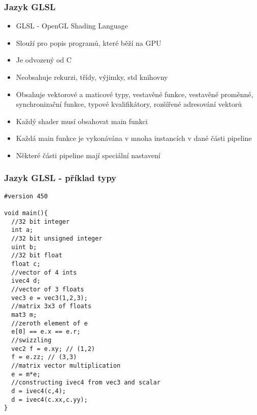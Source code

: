 \begin{frame}
\frametitle{Jazyk GLSL}
  \begin{itemize}
  \item GLSL - OpenGL Shading Language
  \item Slouží pro popis programů, které běží na GPU
  \item Je odvozený od C
  \item Neobsahuje rekurzi, třídy, výjimky, std knihovny
  \item Obsahuje vektorové a maticové typy, vestavěné funkce, vestavěné proměnné, synchronizační funkce, typové kvalifikátory, rozšířené adresování vektorů
  \item Každý shader musí obsahovat main funkci
  \item Každá main funkce je vykonávána v mnoha instancích v dané části pipeline
  \item Některé části pipeline mají speciální nastavení
  \end{itemize}
\end{frame}

\begin{frame}[fragile]
\frametitle{Jazyk GLSL - příklad typy}
		{\scriptsize
\begin{verbatim}
#version 450

void main(){
  //32 bit integer
  int a;
  //32 bit unsigned integer
  uint b;
  //32 bit float
  float c;
  //vector of 4 ints
  ivec4 d;
  //vector of 3 floats
  vec3 e = vec3(1,2,3);
  //matrix 3x3 of floats
  mat3 m;
  //zeroth element of e
  e[0] == e.x == e.r;
  //swizzling 
  vec2 f = e.xy; // (1,2)
  f = e.zz; // (3,3)
  //matrix vector multiplication
  e = m*e;
  //constructing ivec4 from vec3 and scalar
  d = ivec4(c,4);
  d = ivec4(c.xx,c.yy);
}
		\end{verbatim}
		}
\end{frame}


